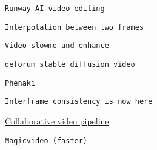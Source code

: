 \begin{verbatim}
Runway AI video editing
\end{verbatim}
         

         
         
          \protect\hypertarget{ID_1447562624}{}{}

\begin{verbatim}
Interpolation between two frames
\end{verbatim}
         

         
         
          \protect\hypertarget{ID_684563557}{}{}

\begin{verbatim}
Video slowmo and enhance
\end{verbatim}
         

         
         
          \protect\hypertarget{ID_1911425729}{}{}

\begin{verbatim}
deforum stable diffusion video
\end{verbatim}
         

         
         
          \protect\hypertarget{ID_772882282}{}{}

\begin{verbatim}
Phenaki
\end{verbatim}
         

         
         
          \protect\hypertarget{ID_103732244}{}{}

\begin{verbatim}
Interframe consistency is now here
\end{verbatim}
         

         
        \tightlist
         
          \protect\hypertarget{ID_957392327}{}{}\protect\hyperlink{ID_1020170411}{Collaborative
          video pipeline}
         

         
         
          \protect\hypertarget{ID_546360816}{}{}

\begin{verbatim}
Magicvideo (faster)
\end{verbatim}
         

         
         
          \protect\hypertarget{ID_1003945997}{}{}


